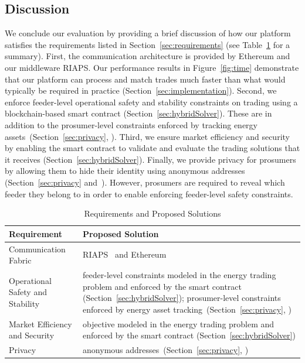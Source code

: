 \subsection{Discussion}



We conclude our evaluation by providing a brief discussion of how our platform satisfies the requirements listed in Section~\ref{sec:requirements} (see Table~\ref{tab:discussion} for a summary).
First, the communication architecture is provided by Ethereum and our middleware RIAPS.
Our performance results in Figure~\ref{fig:time} demonstrate that our platform can process and match trades much faster than what would typically be required in practice (Section~\ref{sec:implementation}).
Second, we enforce feeder-level operational safety and stability constraints on trading using a blockchain-based smart contract (Section~\ref{sec:hybridSolver}).
These are in addition to the prosumer-level constraints enforced by tracking energy assets~(Section~\ref{sec:privacy}, \cite{Laszka17}).
Third, we ensure market efficiency and security by enabling the smart contract to validate and evaluate the trading solutions that it receives (Section~\ref{sec:hybridSolver}).
Finally, we provide privacy for prosumers by allowing them to hide their identity using anonymous addresses (Section~\ref{sec:privacy} and~\cite{Laszka17}). However, prosumers are required to reveal which feeder they belong to in order to enable enforcing feeder-level safety constraints.

\begin{table}[h]
\caption{Requirements and Proposed Solutions}
\label{tab:discussion}
\centering
\setlength{\tabcolsep}{0.3em}
\renewcommand*{\arraystretch}{1.3}
\begin{tabular}{|p{2.6cm}|p{5.75cm}|}
\hline
Requirement & Proposed Solution \\
\hline
\hline
Communication Fabric & RIAPS~\cite{riaps} and Ethereum \\
\hline
Operational Safety and Stability & feeder-level constraints modeled in the energy trading problem and enforced by the smart contract (Section~\ref{sec:hybridSolver}); prosumer-level constraints enforced by energy asset tracking~(Section~\ref{sec:privacy}, \cite{Laszka17}) \\
\hline
Market Efficiency and Security & objective modeled in the energy trading problem and enforced by the smart contract (Section~\ref{sec:hybridSolver})\\
\hline
Privacy & anonymous addresses~(Section~\ref{sec:privacy}, \cite{Laszka17}) \\
\hline
\end{tabular}
\end{table}


